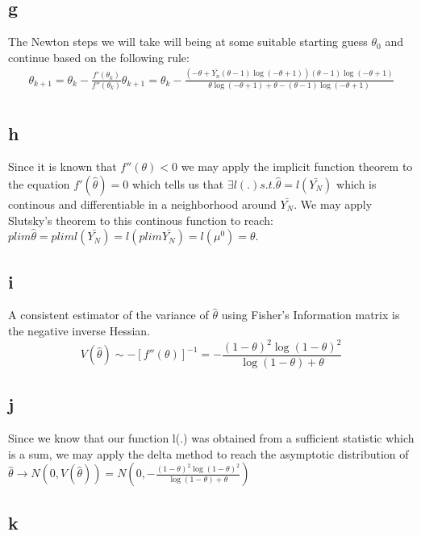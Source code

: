 \documentclass[10pt]{paper}\usepackage[]{graphicx}\usepackage[]{color}
\begin{document}
\subsection*{g}
The Newton steps we will take will being at some suitable starting
guess $\theta_0$ and continue based on the following rule:
\begin{align*}
  \theta_{k+1} = \theta_k - \frac{f'(\theta_k)}{f''(\theta_k)}
  \theta_{k+1} = \theta_k - \frac{\left(- \theta + \bar{Y_n} \left(\theta - 1\right) \log{\left (- \theta + 1 \right )}\right) \left(\theta - 1\right) \log{\left (- \theta + 1 \right )}}{\theta \log{\left (- \theta + 1 \right )} + \theta - \left(\theta - 1\right) \log{\left (- \theta + 1 \right )}}\\
\end{align*}

\subsection*{h}

Since it is known that $f''(\theta) < 0$  we may apply the implicit
function theorem to the equation $f'(\hat{\theta}) = 0$ which tells us that
$\exists l(.) s.t. \hat{\theta} = l( \bar{Y_N} )$ which is continous and
differentiable in a neighborhood around $\bar{Y_N}$. We may apply
Slutsky's theorem to this continous function to reach: $plim \hat{\theta}
= plim l (\bar{Y_N} ) = l( plim \bar{Y_N} ) = l( \mu^0 ) = \theta$.

\subsection*{i}


A consistent estimator of the variance of $\hat{\theta}$ using Fisher's
Information matrix is the negative inverse Hessian.
$$V(\hat{\theta}) \sim - [ f''(\theta) ]^{-1} = - \frac{(1-\theta)^2
  \log(1-\theta)^2}{\log(1-\theta) + \theta}$$

\subsection*{j}


Since we know that our function l(.) was obtained from a sufficient
statistic which is a sum, we may apply the delta method to reach the
asymptotic distribution of $\hat{\theta} \rightarrow N( 0, V( \hat{\theta} ) ) = N
( 0, - \frac{(1-\theta)^2
  \log(1-\theta)^2}{\log(1-\theta) + \theta})$

\subsection*{k}
\end{document}
